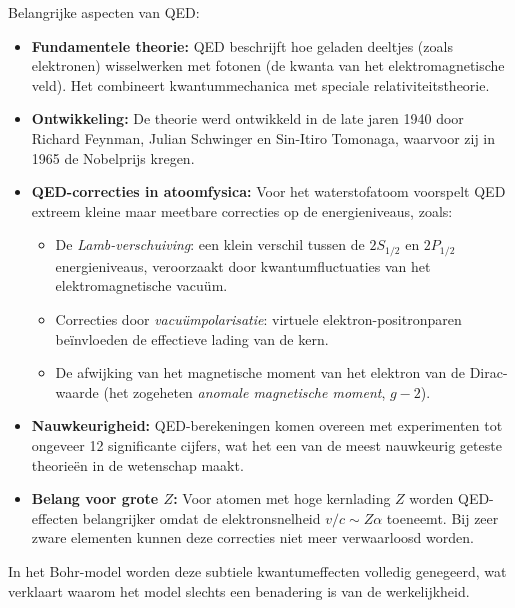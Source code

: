 \documentclass{report} %
\begin{document}
    Belangrijke aspecten van QED:
    \begin{itemize}
        \item \textbf{Fundamentele theorie:} QED beschrijft hoe geladen deeltjes (zoals elektronen) wisselwerken met fotonen (de kwanta van het elektromagnetische veld). Het combineert kwantummechanica met speciale relativiteitstheorie.

        \item \textbf{Ontwikkeling:} De theorie werd ontwikkeld in de late jaren 1940 door Richard Feynman, Julian Schwinger en Sin-Itiro Tomonaga, waarvoor zij in 1965 de Nobelprijs kregen.

        \item \textbf{QED-correcties in atoomfysica:} Voor het waterstofatoom voorspelt QED extreem kleine maar meetbare correcties op de energieniveaus, zoals:
        \begin{itemize}
            \item De \emph{Lamb-verschuiving}: een klein verschil tussen de $2S_{1/2}$ en $2P_{1/2}$ energieniveaus, veroorzaakt door kwantumfluctuaties van het elektromagnetische vacuüm.
            \item Correcties door \emph{vacuümpolarisatie}: virtuele elektron-positronparen beïnvloeden de effectieve lading van de kern.
            \item De afwijking van het magnetische moment van het elektron van de Dirac-waarde (het zogeheten \emph{anomale magnetische moment}, $g-2$).
        \end{itemize}

        \item \textbf{Nauwkeurigheid:} QED-berekeningen komen overeen met experimenten tot ongeveer 12 significante cijfers, wat het een van de meest nauwkeurig geteste theorieën in de wetenschap maakt.

        \item \textbf{Belang voor grote $Z$:} Voor atomen met hoge kernlading $Z$ worden QED-effecten belangrijker omdat de elektronsnelheid $v/c \sim Z\alpha$ toeneemt. Bij zeer zware elementen kunnen deze correcties niet meer verwaarloosd worden.
    \end{itemize}

    In het Bohr-model worden deze subtiele kwantumeffecten volledig genegeerd, wat verklaart waarom het model slechts een benadering is van de werkelijkheid.
\end{document}
